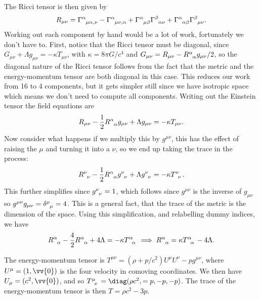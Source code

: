 \documentclass[fleqn]{NotesClass}
\newcommand*{\christoffel}[3]{\tensor{\Gamma}{^{#1}_{{#2}{#3}}}}
\begin{document}
    The Ricci tensor is then given by
    \begin{equation}
        R_{\mu\nu} = \tensor{\Gamma}{^\alpha_{\mu\alpha,\nu}} - \tensor{\Gamma}{^\alpha_{\mu\nu,\alpha}} + \christoffel{\alpha}{\mu}{\beta} \christoffel{\beta}{\alpha}{\nu} + \christoffel{\alpha}{\alpha}{\beta} \christoffel{\beta}{\mu}{\nu}.
    \end{equation}
    Working out each component by hand would be a lot of work, fortunately we don't have to.
    First, notice that the Ricci tensor must be diagonal, since \(G_{\mu\nu} + \Lambda g_{\mu\nu} = -\kappa T_{\mu\nu}\), with \(\kappa = 8\pi G/c^4\) and \(G_{\mu\nu} = R_{\mu\nu} - \tensor{R}{^\alpha_\alpha}g_{\mu\nu}/2\), so the diagonal nature of the Ricci tensor follows from the fact that the metric and the energy-momentum tensor are both diagonal in this case.
    This reduces our work from 16 to 4 components, but it gets simpler still since we have isotropic space which means we don't need to compute all components.
    Writing out the Einstein tensor the field equations are
    \begin{equation}
        R_{\mu\nu} - \frac{1}{2}\tensor{R}{^\alpha_\alpha} g_{\mu\nu} + \Lambda g_{\mu\nu} = -\kappa T_{\mu\nu}.
    \end{equation}
    Now consider what happens if we multiply this by \(g^{\mu\nu}\), this has the effect of raising the \(\mu\) and turning it into a \(\nu\), so we end up taking the trace in the process:
    \begin{equation}
        \tensor{R}{^\nu_\nu} - \frac{1}{2}\tensor{R}{^\alpha_\alpha} \tensor{g}{^\nu_\nu} + \Lambda \tensor{g}{^\nu_\nu} = -\kappa \tensor{T}{^\nu_\nu}.
    \end{equation}
    This further simplifies since \(\tensor{g}{^\nu_\nu} = 1\), which follows since \(g^{\mu\nu}\) is the inverse of \(g_{\mu\nu}\) so \(g^{\mu\nu}g_{\mu\nu} = \tensor{\delta}{^\mu_\mu} = 4\).
    This is a general fact, that the trace of the metric is the dimension of the space.
    Using this simplification, and relabelling dummy indices, we have
    \begin{equation}
        \tensor{R}{^\alpha_\alpha} - \frac{4}{2}\tensor{R}{^\alpha_\alpha} + 4\Lambda = -\kappa\tensor{T}{^\alpha_\alpha} \implies \tensor{R}{^\alpha_\alpha} = \kappa \tensor{T}{^\alpha_\alpha} - 4\Lambda.
    \end{equation}
    
    The energy-momentum tensor is \(T^{\mu\nu} = (\rho + p/c^2)U^\mu U^\nu - pg^{\mu\nu}\), where \(U^\mu = (1, \vv{0})\) is the four velocity in comoving coordinates.
    We then have \(U_\mu = (c^2, \vv{0})\), and so \(\tensor{T}{^\mu_\nu} = \diag(\rho c^2, =p, -p, -p)\).
    The trace of the energy-momentum tensor is then \(T = \rho c^2  - 3p\).
    
\end{document}
